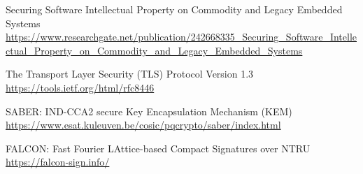 \documentclass[11pt]{article}
\begin{document}
\begin{thebibliography}{7}
Securing Software Intellectual Property on Commodity and Legacy Embedded Systems
\url{https://www.researchgate.net/publication/242668335_Securing_Software_Intellectual_Property_on_Commodity_and_Legacy_Embedded_Systems}

The Transport Layer Security (TLS) Protocol Version 1.3
\url{https://tools.ietf.org/html/rfc8446}

SABER: IND-CCA2 secure Key Encapsulation Mechanism (KEM)
\url{https://www.esat.kuleuven.be/cosic/pqcrypto/saber/index.html}

FALCON: Fast Fourier LAttice-based Compact Signatures over NTRU
\url{https://falcon-sign.info/}



\end{thebibliography}
\end{document}

